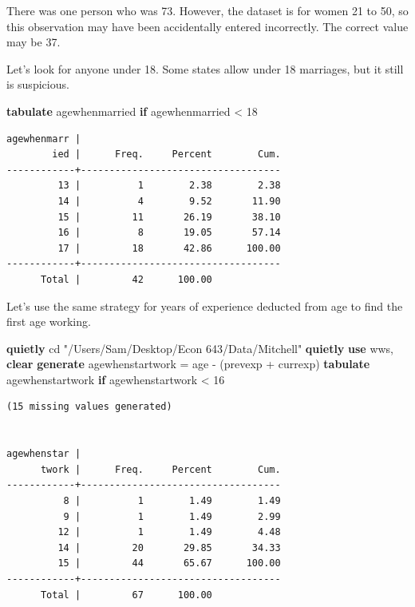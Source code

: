 \documentclass[
]{book}
\newenvironment{Shaded}{\begin{snugshade}}{\end{snugshade}}
\newcommand{\KeywordTok}[1]{\textcolor[rgb]{0.13,0.29,0.53}{\textbf{#1}}}
\newcommand{\NormalTok}[1]{#1}
\newcommand{\StringTok}[1]{\textcolor[rgb]{0.31,0.60,0.02}{#1}}
\begin{document}
There was one person who was 73. However, the dataset is for women 21 to 50, so this observation may have been accidentally entered incorrectly. The correct value may be 37.

Let's look for anyone under 18. Some states allow under 18 marriages, but
it still is suspicious.

\begin{Shaded}
\begin{Highlighting}[]
\KeywordTok{tabulate}\NormalTok{ agewhenmarried }\KeywordTok{if}\NormalTok{ agewhenmarried \textless{} 18}
\end{Highlighting}
\end{Shaded}

\begin{verbatim}
agewhenmarr |
        ied |      Freq.     Percent        Cum.
------------+-----------------------------------
         13 |          1        2.38        2.38
         14 |          4        9.52       11.90
         15 |         11       26.19       38.10
         16 |          8       19.05       57.14
         17 |         18       42.86      100.00
------------+-----------------------------------
      Total |         42      100.00
\end{verbatim}

Let's use the same strategy for years of experience deducted from age to find the first age working.

\begin{Shaded}
\begin{Highlighting}[]
\KeywordTok{quietly}\NormalTok{ cd }\StringTok{"/Users/Sam/Desktop/Econ 643/Data/Mitchell"}
\KeywordTok{quietly} \KeywordTok{use}\NormalTok{ wws, }\KeywordTok{clear}
\KeywordTok{generate}\NormalTok{ agewhenstartwork = age {-} (prevexp + currexp)}
\KeywordTok{tabulate}\NormalTok{ agewhenstartwork }\KeywordTok{if}\NormalTok{ agewhenstartwork \textless{} 16}
\end{Highlighting}
\end{Shaded}

\begin{verbatim}
(15 missing values generated)


agewhenstar |
      twork |      Freq.     Percent        Cum.
------------+-----------------------------------
          8 |          1        1.49        1.49
          9 |          1        1.49        2.99
         12 |          1        1.49        4.48
         14 |         20       29.85       34.33
         15 |         44       65.67      100.00
------------+-----------------------------------
      Total |         67      100.00
\end{verbatim}
\end{document}
